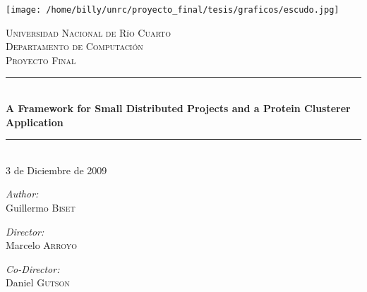 \documentclass[a4paper,12pt,english]{report}
\newcommand{\HRule}{\rule{\linewidth}{0.5mm}}
\begin{document}


\begin{titlepage}
 
\begin{center}

\texttt{[image: /home/billy/unrc/proyecto\_final/tesis/graficos/escudo.jpg]}
 
\textsc{\large Universidad Nacional de R\'io Cuarto \\ \normalsize Departamento de Computaci\'on}\\[2.9cm]
 
\textsc{\normalsize Proyecto Final}\\[0.2cm]
 
\HRule \\[0.4cm]
{ \Large \bfseries A Framework for Small Distributed Projects and a Protein Clusterer Application}\\[0.1cm]
\HRule 
\\[0.6cm]
{\normalsize 3 de Diciembre de 2009}
\vfill
\begin{minipage}{0.25\textwidth}
\begin{flushleft} \large
\emph{Author:}\\
Guillermo \textsc{Biset}
\end{flushleft}
\end{minipage}
\begin{minipage}{0.25\textwidth}
\begin{center} \large
\emph{Director:} \\
Marcelo \textsc{Arroyo}
\end{center}
\end{minipage}
\begin{minipage}{0.25\textwidth}
\begin{flushright} \large
\emph{Co-Director:} \\
Daniel \textsc{Gutson}
\end{flushright}
\end{minipage}
 
\end{center}
 
\end{titlepage}

\newpage
\end{document}
